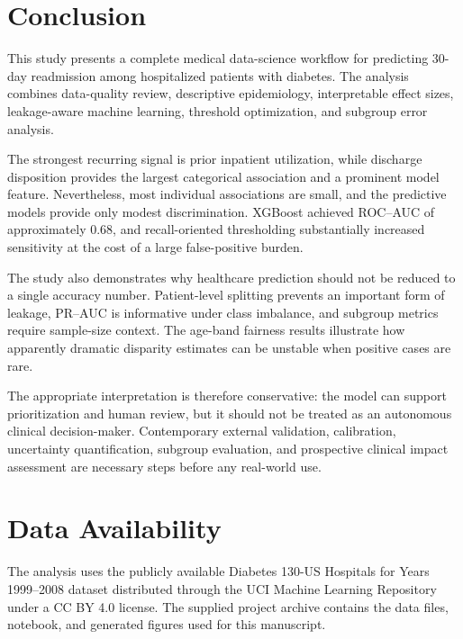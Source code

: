 \documentclass[10pt,a4paper]{article}
\begin{document}
\section{Conclusion}

This study presents a complete medical data-science workflow for predicting 30-day readmission among hospitalized patients with diabetes. The analysis combines data-quality review, descriptive epidemiology, interpretable effect sizes, leakage-aware machine learning, threshold optimization, and subgroup error analysis.

The strongest recurring signal is prior inpatient utilization, while discharge disposition provides the largest categorical association and a prominent model feature. Nevertheless, most individual associations are small, and the predictive models provide only modest discrimination. XGBoost achieved ROC--AUC of approximately 0.68, and recall-oriented thresholding substantially increased sensitivity at the cost of a large false-positive burden.

The study also demonstrates why healthcare prediction should not be reduced to a single accuracy number. Patient-level splitting prevents an important form of leakage, PR--AUC is informative under class imbalance, and subgroup metrics require sample-size context. The age-band fairness results illustrate how apparently dramatic disparity estimates can be unstable when positive cases are rare.

The appropriate interpretation is therefore conservative: the model can support prioritization and human review, but it should not be treated as an autonomous clinical decision-maker. Contemporary external validation, calibration, uncertainty quantification, subgroup evaluation, and prospective clinical impact assessment are necessary steps before any real-world use.

\section*{Data Availability}
The analysis uses the publicly available Diabetes 130-US Hospitals for Years 1999--2008 dataset distributed through the UCI Machine Learning Repository under a CC BY 4.0 license. The supplied project archive contains the data files, notebook, and generated figures used for this manuscript.
\end{document}
